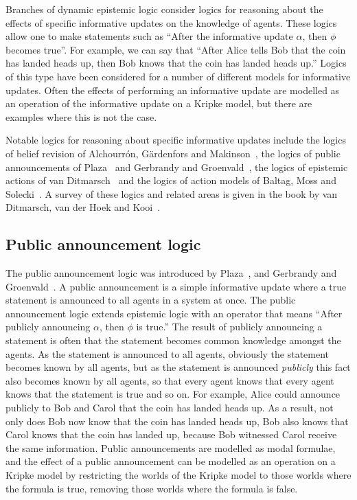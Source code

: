 Branches of dynamic epistemic logic consider logics for reasoning about the
effects of specific informative updates on the knowledge of agents. These logics
allow one to make statements such as ``After the informative update $\alpha$,
then $\phi$ becomes true''. For example, we can say that ``After Alice tells Bob
that the coin has landed heads up, then Bob knows that the coin has landed heads
up.'' Logics of this type have been considered for a number of different models
for informative updates. Often the effects of performing an informative update
are modelled as an operation of the informative update on a Kripke model, but
there are examples where this is not the case.  


Notable logics for reasoning about specific informative updates include the
logics of belief revision of Alchourr{\'o}n, G{\"a}rdenfors and
Makinson~\cite{alchourron:1985}, the logics of public announcements of
Plaza~\cite{plaza:1989} and Gerbrandy and Groenvald~\cite{gerbrandy:1997}, the
logics of epistemic actions of van Ditmarsch~\cite{vanditmarsch:1999,
vanditmarsch:2000, vanditmarsch:2002} and the logics of action models of Baltag,
Moss and Solecki~\cite{baltag:1999, baltag:2004}. A survey of these logics and
related areas is given in the book by van Ditmarsch, van der Hoek and
Kooi~\cite{vanditmarsch:2007}.

\subsection{Public announcement logic}

The public announcement logic was introduced by Plaza~\cite{plaza:1989}, and
Gerbrandy and Groenvald~\cite{gerbrandy:1997}. A public announcement is a simple
informative update where a true statement is announced to all agents in a system
at once. The public announcement logic extends epistemic logic with an
operator that means ``After publicly announcing $\alpha$, then $\phi$ is
true.'' The result of publicly announcing a statement is often that the
statement becomes common knowledge amongst the agents. As the statement is
announced to all agents, obviously the statement becomes known by all agents,
but as the statement is announced {\em publicly} this fact also becomes known
by all agents, so that every agent knows that every agent knows that the
statement is true and so on. For example, Alice could announce publicly to Bob
and Carol that the coin has landed heads up. As a result, not only does Bob now
know that the coin has landed heads up, Bob also knows that Carol knows that
the coin has landed up, because Bob witnessed Carol receive the same
information.  Public announcements are modelled as modal formulae, and the
effect of a public announcement can be modelled as an operation on a Kripke
model by restricting the worlds of the Kripke model to those worlds where the
formula is true, removing those worlds where the formula is false.

